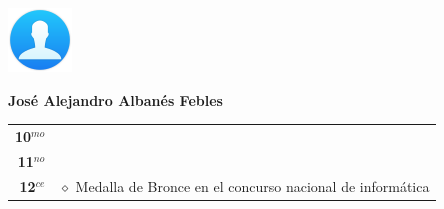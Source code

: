 \begin{minipage}{0.2\textwidth}
	\includegraphics[width=\linewidth]{img/concursantes/user.png} %
\end{minipage}
\hfill
\begin{minipage}{0.7\textwidth}
	\textbf{José Alejandro Albanés Febles }
	
	\vspace*{0.1in}
	\begin{tabular}{rl}
		
		\textbf{10$^{mo}$} &   \\
		
		\textbf{11$^{no}$} &  \\
		
		\textbf{12$^{ce}$} &   $\diamond$ Medalla de Bronce en el concurso nacional de informática\\
		
		
	\end{tabular}
\end{minipage}


